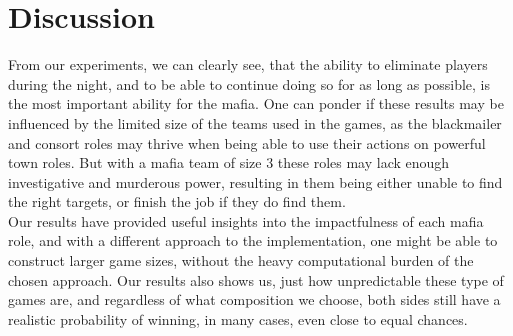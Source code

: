\section{Discussion}\label{sec:discussion}
From our experiments, we can clearly see, that the ability to eliminate players
during the night, and to be able to continue doing so for as long as possible,
is the most important ability for the mafia. One can ponder if these results
may be influenced by the limited size of the teams used in the games, as the
blackmailer and consort roles may thrive when being able to use their actions
on powerful town roles. But with a mafia team of size 3 these roles may lack
enough investigative and murderous power, resulting in them being either unable
to find the right targets, or finish the job if they do find them.\\ Our
results have provided useful insights into the impactfulness of each mafia
role, and with a different approach to the implementation, one might be able to
construct larger game sizes, without the heavy computational burden of the
chosen approach. Our results also shows us, just how unpredictable these type
of games are, and regardless of what composition we choose, both sides still
have a realistic probability of winning, in many cases, even close to equal
chances.
